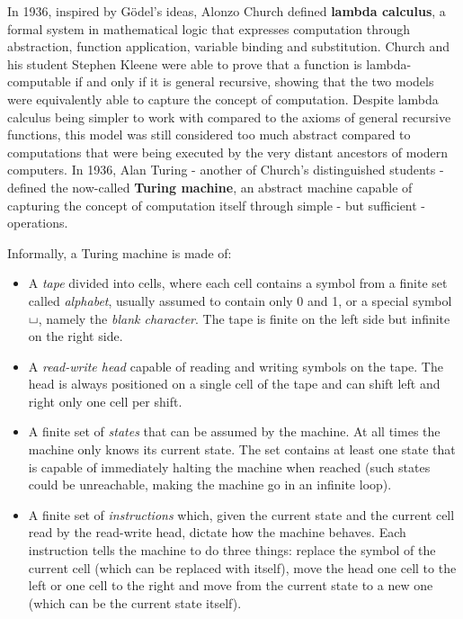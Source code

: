 In 1936, inspired by Gödel's ideas, Alonzo Church defined \textbf{lambda calculus}, a formal system in mathematical logic that expresses computation through abstraction, function application, variable binding and substitution. Church \cite{church} and his student Stephen Kleene \cite{kleene} were able to prove that a function is lambda-computable if and only if it is general recursive, showing that the two models were equivalently able to capture the concept of computation. Despite lambda calculus being simpler to work with compared to the axioms of general recursive functions, this model was still considered too much abstract compared to  computations that were being executed by the very distant ancestors of modern computers. In 1936, Alan Turing - another of Church's distinguished students - defined the now-called \textbf{Turing machine}, an abstract machine capable of capturing the concept of computation itself through simple - but sufficient - operations.

Informally, a Turing machine is made of:
\begin{itemize}
    \item A \textit{tape} divided into cells, where each cell contains a symbol from a finite set called \textit{alphabet}, usually assumed to contain only 0 and 1, or a special symbol $\blankchar$, namely the \textit{blank character}. The tape is finite on the left side but infinite on the right side. 
    \item A \textit{read-write head} capable of reading and writing symbols on the tape. The head is always positioned on a single cell of the tape and can shift left and right only one cell per shift.
    \item A finite set of \textit{states} that can be assumed by the machine. At all times the machine only knows its current state. The set contains at least one state that is capable of immediately halting the machine when reached (such states could be unreachable, making the machine go in an infinite loop).
    \item A finite set of \textit{instructions} which, given the current state and the current cell read by the read-write head, dictate how the machine behaves. Each instruction tells the machine to do three things: replace the symbol of the current cell (which can be replaced with itself), move the head one cell to the left or one cell to the right and move from the current state to a new one (which can be the current state itself).
\end{itemize}

